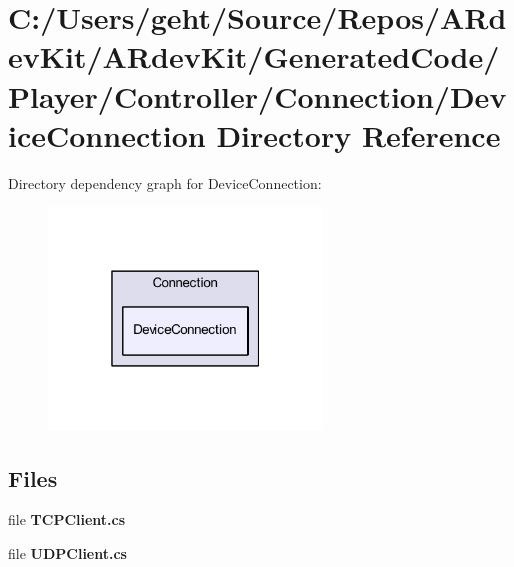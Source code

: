 \section{C\-:/\-Users/geht/\-Source/\-Repos/\-A\-Rdev\-Kit/\-A\-Rdev\-Kit/\-Generated\-Code/\-Player/\-Controller/\-Connection/\-Device\-Connection Directory Reference}
\label{dir_0cd81b7d1746344d6b7ba572e044b0a6}
Directory dependency graph for Device\-Connection\-:
\nopagebreak
\begin{figure}[H]
\begin{center}
\leavevmode
\includegraphics[width=206pt]{dir_0cd81b7d1746344d6b7ba572e044b0a6_dep}
\end{center}
\end{figure}
\subsection*{Files}
\begin{DoxyCompactItemize}
\item 
file {\bfseries T\-C\-P\-Client.\-cs}
\item 
file {\bfseries U\-D\-P\-Client.\-cs}
\end{DoxyCompactItemize}
